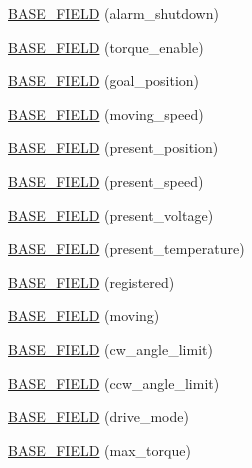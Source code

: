 \begin{DoxyCompactItemize}
\hyperlink{classdynamixel_1_1servos_1_1_base_servo_a9b009f5190906b3851daf59d55b7cb8b}{B\+A\+S\+E\+\_\+\+F\+I\+E\+L\+D} (alarm\+\_\+shutdown)
\item 
\hyperlink{classdynamixel_1_1servos_1_1_base_servo_aa7c4e55ffcd9f798807d7192df7c9a11}{B\+A\+S\+E\+\_\+\+F\+I\+E\+L\+D} (torque\+\_\+enable)
\item 
\hyperlink{classdynamixel_1_1servos_1_1_base_servo_afa45f82edf10091dccc4cacf8731f466}{B\+A\+S\+E\+\_\+\+F\+I\+E\+L\+D} (goal\+\_\+position)
\item 
\hyperlink{classdynamixel_1_1servos_1_1_base_servo_a3319c8cbd3faf82f56f4b3d24a88007d}{B\+A\+S\+E\+\_\+\+F\+I\+E\+L\+D} (moving\+\_\+speed)
\item 
\hyperlink{classdynamixel_1_1servos_1_1_base_servo_a33900c9ece00c4a137d60a2084cdb05e}{B\+A\+S\+E\+\_\+\+F\+I\+E\+L\+D} (present\+\_\+position)
\item 
\hyperlink{classdynamixel_1_1servos_1_1_base_servo_a84ddc664e4dbd299a218d06f7cd77201}{B\+A\+S\+E\+\_\+\+F\+I\+E\+L\+D} (present\+\_\+speed)
\item 
\hyperlink{classdynamixel_1_1servos_1_1_base_servo_ab5167c0a8fec3502cac03b94d2724647}{B\+A\+S\+E\+\_\+\+F\+I\+E\+L\+D} (present\+\_\+voltage)
\item 
\hyperlink{classdynamixel_1_1servos_1_1_base_servo_adebb7ca3f7e87a284b9211d1f94a0dda}{B\+A\+S\+E\+\_\+\+F\+I\+E\+L\+D} (present\+\_\+temperature)
\item 
\hyperlink{classdynamixel_1_1servos_1_1_base_servo_a2c06de53ab5b5e8d910da1dfd172e4f5}{B\+A\+S\+E\+\_\+\+F\+I\+E\+L\+D} (registered)
\item 
\hyperlink{classdynamixel_1_1servos_1_1_base_servo_a46fc43c764852d3aa1a1b839b367af7c}{B\+A\+S\+E\+\_\+\+F\+I\+E\+L\+D} (moving)
\item 
\hyperlink{classdynamixel_1_1servos_1_1_base_servo_ad6f5dae7112bf5ada32bfcab4bdf2249}{B\+A\+S\+E\+\_\+\+F\+I\+E\+L\+D} (cw\+\_\+angle\+\_\+limit)
\item 
\hyperlink{classdynamixel_1_1servos_1_1_base_servo_ac18bbfd90b36bc38b484f250e0e73395}{B\+A\+S\+E\+\_\+\+F\+I\+E\+L\+D} (ccw\+\_\+angle\+\_\+limit)
\item 
\hyperlink{classdynamixel_1_1servos_1_1_base_servo_a66d87963957d700b0cb3e5489280102d}{B\+A\+S\+E\+\_\+\+F\+I\+E\+L\+D} (drive\+\_\+mode)
\item 
\hyperlink{classdynamixel_1_1servos_1_1_base_servo_abfb2b375965a742dae13df7324a340a9}{B\+A\+S\+E\+\_\+\+F\+I\+E\+L\+D} (max\+\_\+torque)
\item 

\end{DoxyCompactItemize}
